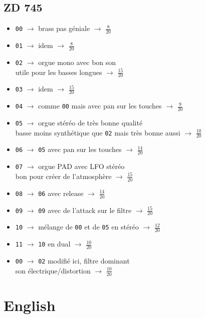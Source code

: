\documentclass[a4paper, 13pt]{article}
\begin{document}
\subsection*{ZD 745}
\begin{itemize}
    \item \texttt{00} $\rightarrow$ brass pas géniale $\rightarrow$ \Large{$\frac{8}{20}$} \normalsize \vspace{0.2cm}
    \item \texttt{01} $\rightarrow$ idem $\rightarrow$ \Large{$\frac{8}{20}$} \normalsize \vspace{0.2cm}
    \item \texttt{02} $\rightarrow$ orgue mono avec bon son \\ utile pour les basses longues $\rightarrow$ \Large{$\frac{15}{20}$} \normalsize \vspace{0.2cm}
    \item \texttt{03} $\rightarrow$ idem $\rightarrow$ \Large{$\frac{15}{20}$} \normalsize \vspace{0.2cm}
    \item \texttt{04} $\rightarrow$ comme \texttt{00} mais avec pan sur les touches $\rightarrow$ \Large{$\frac{9}{20}$} \normalsize \vspace{0.2cm}
    \item \texttt{05} $\rightarrow$ orgue stéréo de très bonne qualité \\
    basse moins synthétique que \texttt{02} mais très bonne aussi $\rightarrow$ \Large{$\frac{10}{20}$} \normalsize \vspace{0.2cm}
    \item \texttt{06} $\rightarrow$ \texttt{05} avec pan sur les touches $\rightarrow$ \Large{$\frac{14}{20}$} \normalsize \vspace{0.2cm}
    \item \texttt{07} $\rightarrow$ orgue PAD avec LFO stéréo \\ bon pour créer de l'atmosphère $\rightarrow$ \Large{$\frac{15}{20}$} \normalsize \vspace{0.2cm}
    \item \texttt{08} $\rightarrow$ \texttt{06} avec release $\rightarrow$ \Large{$\frac{14}{20}$} \normalsize \vspace{0.2cm}
    \item \texttt{09} $\rightarrow$ \texttt{09} avec de l'attack sur le filtre $\rightarrow$ \Large{$\frac{15}{20}$} \normalsize \vspace{0.2cm}
    \item \texttt{10} $\rightarrow$ mélange de \texttt{00} et de \texttt{05} en stéréo $\rightarrow$ \Large{$\frac{12}{20}$} \normalsize \vspace{0.2cm}
    \item \texttt{11} $\rightarrow$ \texttt{10} en dual $\rightarrow$ \Large{$\frac{10}{20}$} \normalsize \vspace{0.2cm}
    \item \texttt{00} $\rightarrow$ \texttt{02} modifié ici, filtre dominant \\ son électrique/distortion $\rightarrow$ \Large{$\frac{10}{20}$} \normalsize \vspace{0.2cm}
\end{itemize}



\vspace{1cm}
\section*{English}
\end{document}

